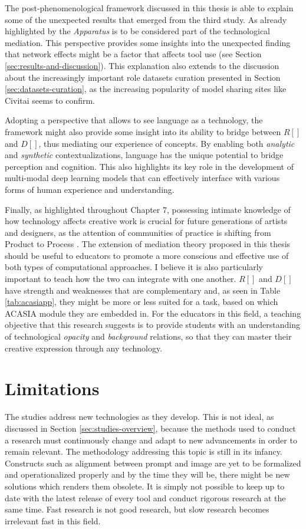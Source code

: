 The post-phenomenological framework discussed in this thesis is able to explain some of the unexpected results that emerged from the third study. As already highlighted by \cite{Flusser1999,Flusser2000} the \emph{Apparatus} is to be considered part of the technological mediation. This perspective provides some insights into the unexpected finding that network effects might be a factor that affects tool use (see Section \ref{sec:results-and-discussion}). This explanation also extends to the discussion about the increasingly important role datasets curation presented in Section \ref{sec:datasets-curation}, as the increasing popularity of model sharing sites like Civitai seems to confirm.

Adopting a perspective that allows to see language as a technology, the framework might also provide some insight into its ability to bridge between $R[]$ and $D[]$, thus mediating our experience of concepts. By enabling both \emph{analytic} and \emph{synthetic} contextualizations, language has the unique potential to bridge perception and cognition. This also highlights its key role in the development of multi-modal deep learning models that can effectively interface with various forms of human experience and understanding.

Finally, as highlighted throughout Chapter 7, possessing intimate knowledge of how technology affects creative work is crucial for future generations of artists and designers, as the attention of communities of practice is shifting from Product to Process \citep{Rhodes1961}. The extension of mediation theory \citep{Ihde1990} proposed in this thesis should be useful to educators to promote a more conscious and effective use of both types of computational approaches. I believe it is also particularly important to teach how the two can integrate with one another. $R[]$ and $D[]$ have strength and weaknesses that are complementary and, as seen in Table \ref{tab:acasiapp}, they might be more or less suited for a task, based on which ACASIA module they are embedded in. For the educators in this field, a teaching objective that this research suggests is to provide students with an understanding of technological \emph{opacity} and \emph{background} relations, so that they can master their creative expression through any technology.

\section{Limitations}
The studies address new technologies as they develop. This is not ideal, as discussed in Section \ref{sec:studies-overview}, because the methods used to conduct a research must continuously change and adapt to new advancements in order to remain relevant.
The methodology addressing this topic is still in its infancy. Constructs such as alignment between prompt and image are yet to be formalized and operationalized properly and by the time they will be, there might be new solutions which renders them obsolete. It is simply not possible to keep up to date with the latest release of every tool and conduct rigorous research at the same time. Fast research is not good research, but slow research becomes irrelevant fast in this field.  

